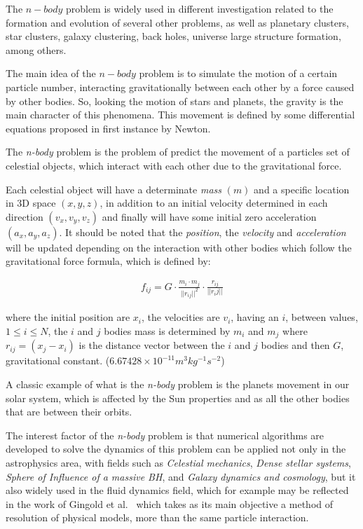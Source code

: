 The $n-body$ problem is widely used in different investigation
related to the formation and evolution of several other problems,
as well as planetary clusters, star clusters, galaxy clustering, back holes,
universe large structure formation, among others.

The main idea of the $n-body$ problem is to simulate the
motion of a certain particle number, interacting gravitationally
between each other by a force caused by other bodies.
So, looking the motion of stars and planets, the gravity
is the main character of this phenomena.
This movement is defined by some differential equations
proposed in first instance by Newton.

The \emph{n-body} problem is the problem of
predict the movement of a particles set of celestial objects,
which interact with each other due to the gravitational force.

Each celestial object will have a determinate \emph{mass} $(m)$
and a specific location in 3D space
$(x, y, z)$, in addition to an initial velocity
determined in each direction $(v_{x}, v_{y}, v_{z})$ and finally
will have some initial zero acceleration $(a_{x}, a_{y}, a_{z})$.
It should be noted that the \emph{position}, the \emph{velocity} and \emph{acceleration}
will be updated depending on the interaction with other bodies
which follow the gravitational force formula,
which is defined by:

\begin{eqnarray}
    f_{ij} =G \cdot \frac{m_i \cdot m_j}{||r_{ij}||^{2}} \cdot \frac{r_{ij}}{||r_ij||}
\end{eqnarray}

where the initial position are $x_{i}$,
the velocities are $v_{i}$,
having an $i$, between values, $1\leq i\leq N$,
the $i$ and $j$ bodies mass is determined by $m_{i}$ and $m_{j}$
where $r_{ij} = (x_{j} - x_{i})$ is the distance vector between the $i$ and $j$ bodies
and then $G$, gravitational constant. ($6.67428\times 10^{-11} m^{3} kg^{-1} s^{-2}$)

A classic example of what is the \emph{n-body} problem
is the planets movement in our solar system,
which is affected by the Sun properties
and as all the other bodies that are between their orbits.

The interest factor of the \emph{n-body} problem
is that numerical algorithms are developed to solve
the dynamics of this problem can be applied not only in the astrophysics area,
with fields such as \emph{Celestial mechanics}, \emph{Dense stellar systems},
\emph{Sphere of Influence of a massive BH}, and \emph{Galaxy dynamics and cosmology},
but it also widely used in the fluid dynamics field,
which for example may be reflected in the work of Gingold et al.~\cite{Gingold}
which takes as its main objective a method of resolution of physical models,
more than the same particle interaction.

